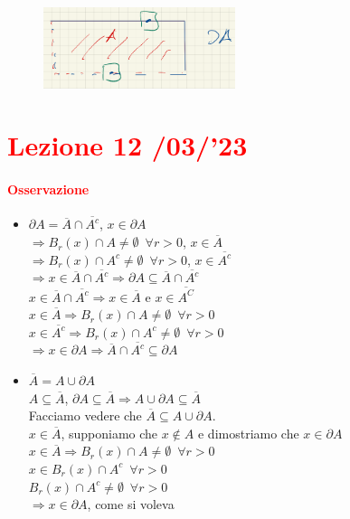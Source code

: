\documentclass{article}
\begin{document}
\begin{figure}[h!]
    \centering
    \includegraphics[width=0.5\textwidth]{Screenshot from 2023-03-22 17-49-55.png}
\end{figure}

\newpage
\section{\textcolor{red}{Lezione 12 \space{}/03/'23}}

\paragraph{\textcolor{red}{Osservazione}}
\begin{itemize}
    \item $\partial A = \overline{A} \cap \overline{A^c}$, $x \in \partial A$\\
        $\Rightarrow B_r (x)\cap A \neq \emptyset \,\,\, \forall r>0$, $x\in \overline{A}$\\
        $\Rightarrow B_r(x)\cap A^c \neq \emptyset \,\,\,\forall r>0$, $x\in \overline{A^c}$\\
        $\Rightarrow x \in \overline{A} \cap \overline{A^c} \Rightarrow \partial A \subseteq \overline{A} \cap \overline{A^c}$\\
        $x\in\overline{A}\cap \overline{A^c} \Rightarrow x\in \overline{A} $ e $x \in \overline{A^C}$\\
        $x \in \overline{A} \Rightarrow B_r(x)\cap A\neq \emptyset\,\,\, \forall r>0$\\
        $x \in \overline{A^c} \Rightarrow B_r(x)\cap A^c \neq \emptyset\,\,\, \forall r>0$\\
        $\Rightarrow x\in \partial A \Rightarrow \overline{A} \cap \overline{A^c} \subseteq \partial A$
    \item $\overline{A}=A \cup \partial A$\\
        $A \subseteq \overline{A}$, $\partial A \subseteq \overline{A} \Rightarrow A \cup \partial A \subseteq \overline{A}$\\
        Facciamo vedere che $\overline{A}\subseteq A \cup \partial A$.\\
        $x\in \overline{A}$, supponiamo che $x\notin A$ e dimostriamo che $x \in \partial A$\\
        $x\in \overline{A}  \Rightarrow B_r(x)\cap A \neq \emptyset \,\,\, \forall r>0$\\
        $x \in B_r (x)\cap A^c \,\,\,\forall r >0$\\
        $B_r(x)\cap A^c \neq \emptyset \,\,\, \forall r>0$\\
        $\Rightarrow x\in \partial A$, come si voleva
\end{itemize}
\end{document}
